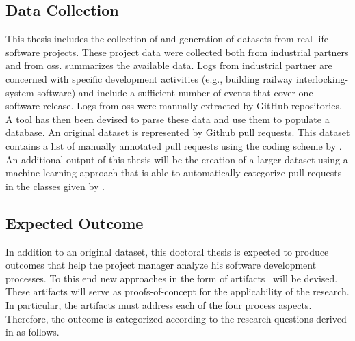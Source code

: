 \documentclass[a4paper,11pt]{article}
\begin{document}
%	
%	


\subsection{Data Collection}

This thesis includes the collection of and generation of datasets from real life software projects. These project data were collected both from industrial partners and from \gls{oss}.  summarizes the available data. Logs from industrial partner are concerned with specific development activities (e.g., building railway interlocking-system software) and include a sufficient number of events that cover one software release. Logs from \gls{oss} were manually extracted by GitHub repositories. A tool has then been devised to parse these data and use them to populate a database. An original dataset is represented by Github pull requests. This dataset contains a list of manually annotated pull requests using the coding scheme by \cite{Majchrzak2016}. An additional output of this thesis will be the creation of a larger dataset using a machine learning approach that is able to automatically categorize pull requests in the classes given by \cite{Majchrzak2016}.



\subsection{Expected Outcome}

In addition to an original dataset, this doctoral thesis is expected to produce outcomes that help the project manager analyze his software development processes. To this end new approaches in the form of artifacts~\cite{Peffers2008} will be devised. These artifacts will serve as proofs-of-concept for the applicability of the research. In particular, the artifacts must address each of the four process aspects. Therefore, the outcome is categorized according to the research questions derived in  as follows.
\end{document}
